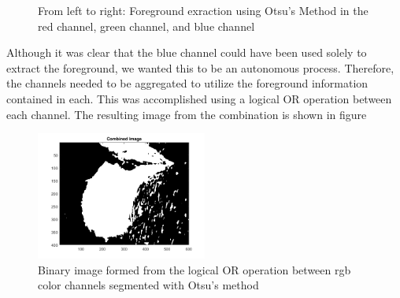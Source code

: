 \documentclass{article}[12 pt]
\begin{document}
\begin{figure}[H]
\captionsetup[subfloat]{labelformat=empty}
\centering
{} 
\caption{From left to right: Foreground exraction using Otsu's Method in the red channel, green channel, and blue channel}
\label{otsu}
\end{figure}

\noindent
Although it was clear that the blue channel could have been used solely to extract the foreground, we wanted this to be an autonomous process.  Therefore, the channels needed to be aggregated to utilize the foreground information contained in each.  This was accomplished using a logical OR operation between each channel.  The resulting image from  the combination is shown in figure 


\begin{center}
	\begin{figure}[H]
		\centering
		\includegraphics[width = 0.5\textwidth]{Images/combinedImage.png}
		\caption{Binary image formed from the logical OR operation between rgb color channels segmented with Otsu's method}
		\label{scene}
	\end{figure}
\end{center}
\end{document}
